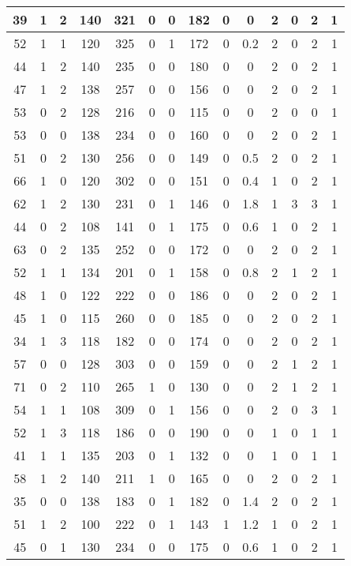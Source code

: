 \documentclass{article}
\begin{document}
\begin{longtable}{|c|c|c|c|c|c|c|c|c|c|c|c|c|c|}
39 & 1 & 2 & 140 & 321 & 0 & 0 & 182 & 0 & 0 & 2 & 0 & 2 & 1\\ \hline
52 & 1 & 1 & 120 & 325 & 0 & 1 & 172 & 0 & 0.2 & 2 & 0 & 2 & 1\\ \hline
44 & 1 & 2 & 140 & 235 & 0 & 0 & 180 & 0 & 0 & 2 & 0 & 2 & 1\\ \hline
47 & 1 & 2 & 138 & 257 & 0 & 0 & 156 & 0 & 0 & 2 & 0 & 2 & 1\\ \hline
53 & 0 & 2 & 128 & 216 & 0 & 0 & 115 & 0 & 0 & 2 & 0 & 0 & 1\\ \hline
53 & 0 & 0 & 138 & 234 & 0 & 0 & 160 & 0 & 0 & 2 & 0 & 2 & 1\\ \hline
51 & 0 & 2 & 130 & 256 & 0 & 0 & 149 & 0 & 0.5 & 2 & 0 & 2 & 1\\ \hline
66 & 1 & 0 & 120 & 302 & 0 & 0 & 151 & 0 & 0.4 & 1 & 0 & 2 & 1\\ \hline
62 & 1 & 2 & 130 & 231 & 0 & 1 & 146 & 0 & 1.8 & 1 & 3 & 3 & 1\\ \hline
44 & 0 & 2 & 108 & 141 & 0 & 1 & 175 & 0 & 0.6 & 1 & 0 & 2 & 1\\ \hline
63 & 0 & 2 & 135 & 252 & 0 & 0 & 172 & 0 & 0 & 2 & 0 & 2 & 1\\ \hline
52 & 1 & 1 & 134 & 201 & 0 & 1 & 158 & 0 & 0.8 & 2 & 1 & 2 & 1\\ \hline
48 & 1 & 0 & 122 & 222 & 0 & 0 & 186 & 0 & 0 & 2 & 0 & 2 & 1\\ \hline
45 & 1 & 0 & 115 & 260 & 0 & 0 & 185 & 0 & 0 & 2 & 0 & 2 & 1\\ \hline
34 & 1 & 3 & 118 & 182 & 0 & 0 & 174 & 0 & 0 & 2 & 0 & 2 & 1\\ \hline
57 & 0 & 0 & 128 & 303 & 0 & 0 & 159 & 0 & 0 & 2 & 1 & 2 & 1\\ \hline
71 & 0 & 2 & 110 & 265 & 1 & 0 & 130 & 0 & 0 & 2 & 1 & 2 & 1\\ \hline
54 & 1 & 1 & 108 & 309 & 0 & 1 & 156 & 0 & 0 & 2 & 0 & 3 & 1\\ \hline
52 & 1 & 3 & 118 & 186 & 0 & 0 & 190 & 0 & 0 & 1 & 0 & 1 & 1\\ \hline
41 & 1 & 1 & 135 & 203 & 0 & 1 & 132 & 0 & 0 & 1 & 0 & 1 & 1\\ \hline
58 & 1 & 2 & 140 & 211 & 1 & 0 & 165 & 0 & 0 & 2 & 0 & 2 & 1\\ \hline
35 & 0 & 0 & 138 & 183 & 0 & 1 & 182 & 0 & 1.4 & 2 & 0 & 2 & 1\\ \hline
51 & 1 & 2 & 100 & 222 & 0 & 1 & 143 & 1 & 1.2 & 1 & 0 & 2 & 1\\ \hline
45 & 0 & 1 & 130 & 234 & 0 & 0 & 175 & 0 & 0.6 & 1 & 0 & 2 & 1\\ \hline

\end{longtable}
\end{document}
